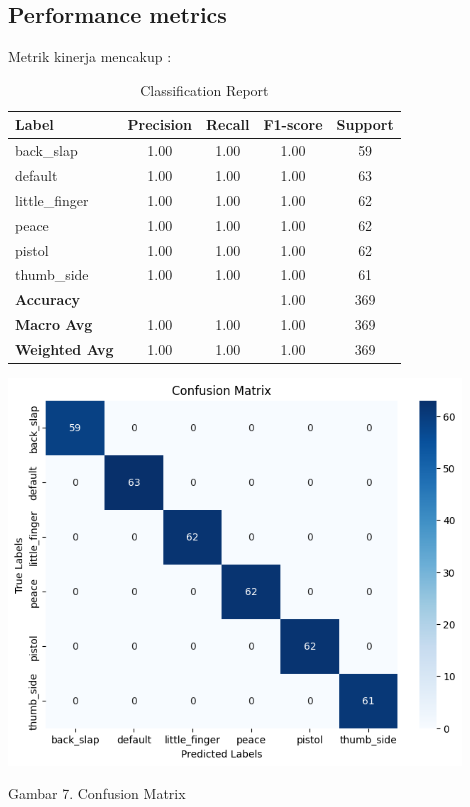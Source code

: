 \documentclass[12pt,a4paper]{article}
\begin{document}
\subsection{Performance metrics}
Metrik kinerja mencakup : 
\begin{table}[ht]
\centering
\begin{tabular}{|l|c|c|c|c|}
\hline
\textbf{Label} & \textbf{Precision} & \textbf{Recall} & \textbf{F1-score} & \textbf{Support} \\ \hline
back\_slap     & 1.00              & 1.00            & 1.00              & 59              \\ \hline
default        & 1.00              & 1.00            & 1.00              & 63              \\ \hline
little\_finger & 1.00              & 1.00            & 1.00              & 62              \\ \hline
peace          & 1.00              & 1.00            & 1.00              & 62              \\ \hline
pistol         & 1.00              & 1.00            & 1.00              & 62              \\ \hline
thumb\_side    & 1.00              & 1.00            & 1.00              & 61              \\ \hline
\textbf{Accuracy}    &                    &                 & {1.00}     & {369}     \\ \hline
\textbf{Macro Avg}    & 1.00              & 1.00            & 1.00              & 369             \\ \hline
\textbf{Weighted Avg} & 1.00              & 1.00            & 1.00              & 369             \\ \hline
\end{tabular}
\caption{Classification Report}
\label{tab:classification_report}
\end{table}

\begin{center}
    \includegraphics[width=0.9\textwidth]{images/7.png}
\end{center}
\begin{center}
    Gambar 7. Confusion Matrix
\end{center}
\end{document}
